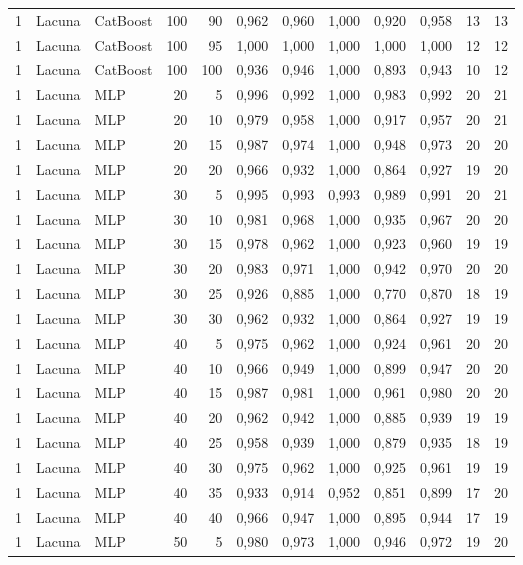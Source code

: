 \begin{longtable}{@{}rllrrrrrrrrr@{}}
1 & Lacuna & CatBoost & 100 & 90 & 0,962 & 0,960 & 1,000 & 0,920 & 0,958 & 13 & 13 \\
1 & Lacuna & CatBoost & 100 & 95 & 1,000 & 1,000 & 1,000 & 1,000 & 1,000 & 12 & 12 \\
1 & Lacuna & CatBoost & 100 & 100 & 0,936 & 0,946 & 1,000 & 0,893 & 0,943 & 10 & 12 \\
1 & Lacuna & MLP & 20 & 5 & 0,996 & 0,992 & 1,000 & 0,983 & 0,992 & 20 & 21 \\
1 & Lacuna & MLP & 20 & 10 & 0,979 & 0,958 & 1,000 & 0,917 & 0,957 & 20 & 21 \\
1 & Lacuna & MLP & 20 & 15 & 0,987 & 0,974 & 1,000 & 0,948 & 0,973 & 20 & 20 \\
1 & Lacuna & MLP & 20 & 20 & 0,966 & 0,932 & 1,000 & 0,864 & 0,927 & 19 & 20 \\
1 & Lacuna & MLP & 30 & 5 & 0,995 & 0,993 & 0,993 & 0,989 & 0,991 & 20 & 21 \\
1 & Lacuna & MLP & 30 & 10 & 0,981 & 0,968 & 1,000 & 0,935 & 0,967 & 20 & 20 \\
1 & Lacuna & MLP & 30 & 15 & 0,978 & 0,962 & 1,000 & 0,923 & 0,960 & 19 & 19 \\
1 & Lacuna & MLP & 30 & 20 & 0,983 & 0,971 & 1,000 & 0,942 & 0,970 & 20 & 20 \\
1 & Lacuna & MLP & 30 & 25 & 0,926 & 0,885 & 1,000 & 0,770 & 0,870 & 18 & 19 \\
1 & Lacuna & MLP & 30 & 30 & 0,962 & 0,932 & 1,000 & 0,864 & 0,927 & 19 & 19 \\
1 & Lacuna & MLP & 40 & 5 & 0,975 & 0,962 & 1,000 & 0,924 & 0,961 & 20 & 20 \\
1 & Lacuna & MLP & 40 & 10 & 0,966 & 0,949 & 1,000 & 0,899 & 0,947 & 20 & 20 \\
1 & Lacuna & MLP & 40 & 15 & 0,987 & 0,981 & 1,000 & 0,961 & 0,980 & 20 & 20 \\
1 & Lacuna & MLP & 40 & 20 & 0,962 & 0,942 & 1,000 & 0,885 & 0,939 & 19 & 19 \\
1 & Lacuna & MLP & 40 & 25 & 0,958 & 0,939 & 1,000 & 0,879 & 0,935 & 18 & 19 \\
1 & Lacuna & MLP & 40 & 30 & 0,975 & 0,962 & 1,000 & 0,925 & 0,961 & 19 & 19 \\
1 & Lacuna & MLP & 40 & 35 & 0,933 & 0,914 & 0,952 & 0,851 & 0,899 & 17 & 20 \\
1 & Lacuna & MLP & 40 & 40 & 0,966 & 0,947 & 1,000 & 0,895 & 0,944 & 17 & 19 \\
1 & Lacuna & MLP & 50 & 5 & 0,980 & 0,973 & 1,000 & 0,946 & 0,972 & 19 & 20 \\

\end{longtable}
